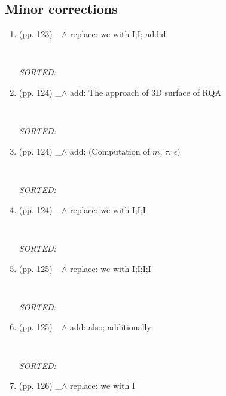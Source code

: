 \documentclass[12pt]{article}
\begin{document}
\subsection{Minor corrections}
\begin{enumerate}

\item  (pp. 123)  \_$\wedge$  
	replace: we with I;I; add:d
	\begin{verbatim}
	
	\end{verbatim}
	\textit{
	SORTED:  
	}
	\\

\item  (pp. 124)  \_$\wedge$  
	add: The approach of 3D surface of RQA
	\begin{verbatim}
	
	\end{verbatim}
	\textit{
	SORTED:  
	}
	\\

\item  (pp. 124)  \_$\wedge$  
	add: (Computation of $m$, $\tau$, $\epsilon$)
	\begin{verbatim}
	
	\end{verbatim}
	\textit{
	SORTED:  
	}
	\\




\item  (pp. 124)  \_$\wedge$  
	replace: we with I;I;I
	\begin{verbatim}
	
	\end{verbatim}
	\textit{
	SORTED:  
	}
	\\



\item  (pp. 125)  \_$\wedge$  
	replace: we with I;I;I;I
	\begin{verbatim}
	
	\end{verbatim}
	\textit{
	SORTED:  
	}
	\\

\item  (pp. 125)  \_$\wedge$  
	add: also; additionally
	\begin{verbatim}
	
	\end{verbatim}
	\textit{
	SORTED:  
	}
	\\


\item  (pp. 126)  \_$\wedge$  
	replace: we with I
	\begin{verbatim}
	

\end{verbatim}
\end{enumerate}
\end{document}
